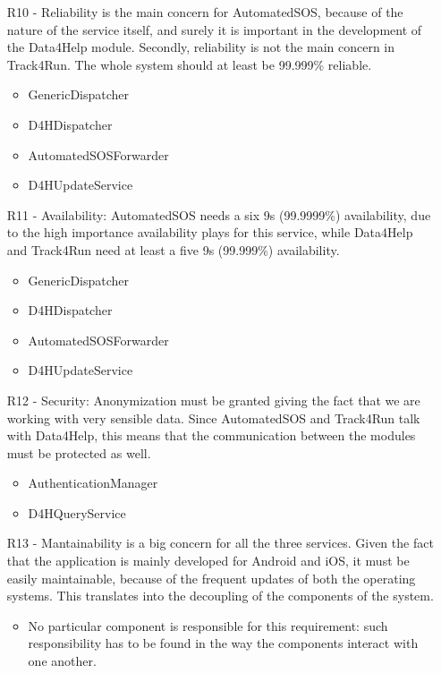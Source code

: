 \begin{itemize}
\item [R10] - Reliability is the main concern for AutomatedSOS, because of the nature of the service itself, and surely it is important in the development of the Data4Help module. Secondly, reliability is not the main concern in Track4Run.
The whole system should at least be 99.999\% reliable.
\begin{itemize}
	\item GenericDispatcher
	\item D4HDispatcher
	\item AutomatedSOSForwarder
	\item D4HUpdateService
\end{itemize}


\item [R11] - Availability: 
AutomatedSOS needs a six 9s (99.9999\%) availability, due to the high importance availability plays for this service, while Data4Help and Track4Run need at least a five 9s (99.999\%) availability.
\begin{itemize}
	\item GenericDispatcher
	\item D4HDispatcher
	\item AutomatedSOSForwarder
	\item D4HUpdateService
\end{itemize}


\item [R12] - Security: Anonymization must be granted giving the fact that we are working with very sensible data.
Since AutomatedSOS and Track4Run talk with Data4Help, this means that the communication between the modules must be protected as well. 
\begin{itemize}
	\item AuthenticationManager
	\item D4HQueryService
\end{itemize}

\item[R13] - Mantainability is a big concern for all the three services. Given the fact that the application is mainly developed for Android and iOS, it must be easily maintainable, because of the frequent updates of both the operating systems. This translates into the decoupling of the components of the system.
\begin{itemize}
	\item No particular component is responsible for this requirement: such responsibility has to be found in the way the components interact with one another.
\end{itemize}




\end{itemize}
